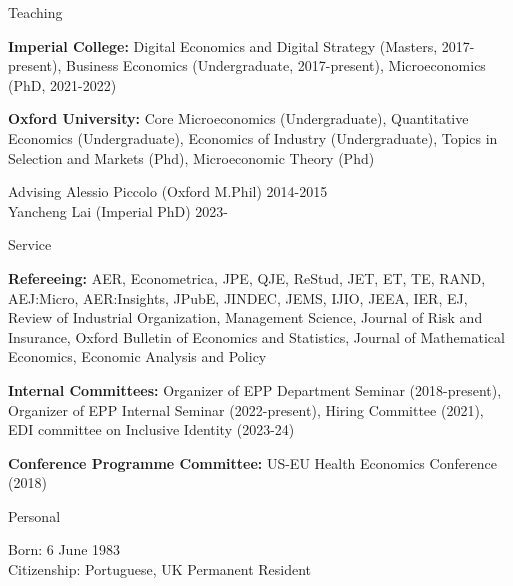 \documentclass{resume}
\begin{document}
\begin{rSection}{Teaching}

\textbf{Imperial College:} Digital Economics and Digital Strategy (Masters, 2017-present), Business Economics (Undergraduate, 2017-present), Microeconomics (PhD, 2021-2022)

\textbf{Oxford University:} Core Microeconomics (Undergraduate), Quantitative Economics (Undergraduate), Economics of Industry (Undergraduate), Topics in Selection and Markets (Phd), Microeconomic Theory (Phd)

\end{rSection}








\begin{rSection}{Advising}
	Alessio Piccolo (Oxford M.Phil) \hfill {2014-2015} \\
	Yancheng Lai (Imperial PhD) \hfill {2023-}		
\end{rSection}




\begin{rSection}{Service}

\textbf{Refereeing:} AER, Econometrica, JPE, QJE, ReStud, JET, ET, TE, RAND, AEJ:Micro, AER:Insights, JPubE, JINDEC, JEMS, IJIO, JEEA, IER, EJ, Review of Industrial Organization, Management Science, Journal of Risk and Insurance, Oxford Bulletin of Economics and Statistics, Journal of Mathematical Economics, Economic Analysis and Policy


\textbf{Internal Committees:} Organizer of EPP Department Seminar (2018-present), Organizer of EPP Internal Seminar  (2022-present),  Hiring Committee (2021), EDI committee on Inclusive Identity (2023-24)

\textbf{Conference Programme Committee:} US-EU Health Economics Conference (2018)
	
\end{rSection}




\begin{rSection}{Personal}

Born: 6 June 1983
\\ Citizenship: Portuguese, UK Permanent Resident

\end{rSection}
\end{document}
